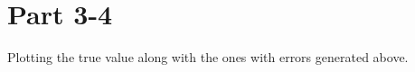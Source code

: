 \documentclass[11pt]{article}
\begin{document}
    \hypertarget{part-3-4}{%
\section{Part 3-4}\label{part-3-4}}

Plotting the true value along with the ones with errors generated above.

	

	
		
	
	
		
			
		
	
		
			
		
	
		
			
		
	
		
			
		
	
		
			
		
	
		
			
		
	
		
			
		
	
		
			
		
	
		
			
		
	
		
			
		
	
		
			
		
	
		
			
		
	
		
			
		
	
\end{document}
